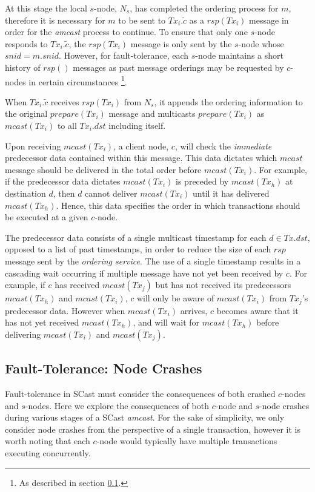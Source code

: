 \begin{enumerate}
        At this stage the local $s$-node, $N_s$, has completed the ordering process for $m$, therefore it is necessary for $m$ to be sent to $Tx_i.\tilde{c}$ as a $rsp(Tx_i)$ message in order for the \emph{amcast} process to continue.  To ensure that only one $s$-node responds to $Tx_i.\tilde{c}$, the $rsp(Tx_i)$ message is only sent by the $s$-node whose $snid = m.snid$.  However, for fault-tolerance, each $s$-node maintains a short history of $rsp()$ messages as past message orderings may be requested by $c$-nodes in certain circumstances \footnote{As described in section \ref{ssec:scast_fault_tolerance}.}.          
        
        \leftbar
        When $Tx_i.\tilde{c}$ receives $rsp(Tx_i)$ from $N_s$, it appends the ordering information to the original $prepare(Tx_i)$ message and multicasts $prepare(Tx_i)$ as $mcast(Tx_i)$ to all $Tx_i.dst$ including itself. 
        \endleftbar
        
        \leftbar
        Upon receiving $mcast(Tx_i)$, a client node, $c$, will check the \emph{immediate} predecessor data contained within this message.  This data dictates which $mcast$ message should be delivered in the total order before $mcast(Tx_i)$.  For example, if the predecessor data dictates $mcast(Tx_i)$ is preceded by $mcast(Tx_h)$ at destination $d$, then $d$ cannot deliver $mcast(Tx_i)$ until it has delivered $mcast(Tx_h)$.  Hence, this data specifies the order in which transactions should be executed at a given $c$-node.  
        
        The predecessor data consists of a single multicast timestamp for each $d \in Tx.dst$, opposed to a list of past timestamps, in order to reduce the size of each $rsp$ message sent by the \emph{ordering service}.  The use of a single timestamp results in a cascading wait occurring if multiple message have not yet been received by $c$.  For example, if $c$ has received $mcast(Tx_j)$ but has not received its predecessors $mcast(Tx_h)$ and $mcast(Tx_i)$, $c$ will only be aware of $mcast(Tx_i)$ from $Tx_j$'s predecessor data.  However when $mcast(Tx_i)$ arrives, $c$ becomes aware that it has not yet received $mcast(Tx_h)$,  and will wait for $mcast(Tx_h)$ before delivering $mcast(Tx_i)$ and $mcast(Tx_j)$.          
        \endleftbar
    \end{enumerate}

	\subsection{Fault-Tolerance: Node Crashes}\label{ssec:scast_fault_tolerance}
	Fault-tolerance in \textsf{SCast} must consider the consequences of both crashed $c$-nodes and $s$-nodes.  Here we explore the consequences of both $c$-node and $s$-node crashes during various stages of a \textsf{SCast} \emph{amcast}.  For the sake of simplicity, we only consider node crashes from the perspective of a single transaction, however it is worth noting that each $c$-node would typically have multiple transactions executing concurrently.  
	
